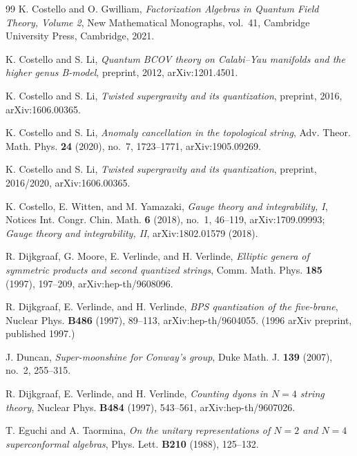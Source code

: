 \begin{thebibliography}{99}
K. Costello and O. Gwilliam, \emph{Factorization Algebras in Quantum Field Theory, Volume 2}, New Mathematical Monographs, vol.~41, Cambridge University Press, Cambridge, 2021.

K. Costello and S. Li, \emph{Quantum BCOV theory on Calabi--Yau manifolds and the higher genus B-model}, preprint, 2012, arXiv:1201.4501.

K. Costello and S. Li, \emph{Twisted supergravity and its quantization}, preprint, 2016, arXiv:1606.00365.

K. Costello and S. Li, \emph{Anomaly cancellation in the topological string}, Adv. Theor. Math. Phys. \textbf{24} (2020), no.~7, 1723--1771, arXiv:1905.09269.

K. Costello and S. Li, \emph{Twisted supergravity and its quantization}, preprint, 2016/2020, arXiv:1606.00365.

K. Costello, E. Witten, and M. Yamazaki, \emph{Gauge theory and integrability, I}, Notices Int. Congr. Chin. Math. \textbf{6} (2018), no.~1, 46--119, arXiv:1709.09993; \emph{Gauge theory and integrability, II}, arXiv:1802.01579 (2018).

R. Dijkgraaf, G. Moore, E. Verlinde, and H. Verlinde, \emph{Elliptic genera of symmetric products and second quantized strings}, Comm. Math. Phys. \textbf{185} (1997), 197--209, arXiv:hep-th/9608096.

R. Dijkgraaf, E. Verlinde, and H. Verlinde, \emph{BPS quantization of the five-brane}, Nuclear Phys. \textbf{B486} (1997), 89--113, arXiv:hep-th/9604055. (1996 arXiv preprint, published 1997.)

J. Duncan, \emph{Super-moonshine for Conway's group}, Duke Math. J. \textbf{139} (2007), no.~2, 255--315.

R. Dijkgraaf, E. Verlinde, and H. Verlinde, \emph{Counting dyons in $N=4$ string theory}, Nuclear Phys. \textbf{B484} (1997), 543--561, arXiv:hep-th/9607026.

T. Eguchi and A. Taormina, \emph{On the unitary representations of $N=2$ and $N=4$ superconformal algebras}, Phys. Lett. \textbf{B210} (1988), 125--132.


\end{thebibliography}
